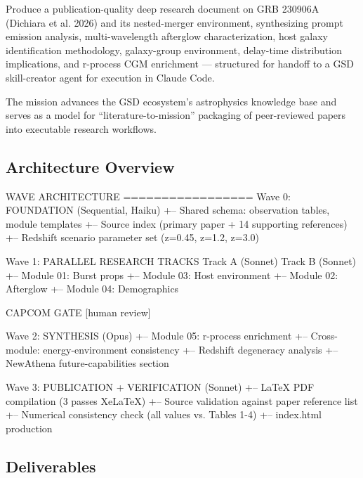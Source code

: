 \documentclass[11pt,letterpaper]{article}
\begin{document}
Produce a publication-quality deep research document on GRB 230906A (Dichiara et al. 2026) and its nested-merger environment, synthesizing prompt emission analysis, multi-wavelength afterglow characterization, host galaxy identification methodology, galaxy-group environment, delay-time distribution implications, and r-process CGM enrichment --- structured for handoff to a GSD skill-creator agent for execution in Claude Code.

The mission advances the GSD ecosystem's astrophysics knowledge base and serves as a model for ``literature-to-mission'' packaging of peer-reviewed papers into executable research workflows.

\subsection{Architecture Overview}

\begin{asciibox}
WAVE ARCHITECTURE
=================
Wave 0: FOUNDATION (Sequential, Haiku)
  +-- Shared schema: observation tables, module templates
  +-- Source index (primary paper + 14 supporting references)
  +-- Redshift scenario parameter set (z=0.45, z=1.2, z=3.0)

Wave 1: PARALLEL RESEARCH TRACKS
  Track A (Sonnet)              Track B (Sonnet)
  +-- Module 01: Burst props    +-- Module 03: Host environment
  +-- Module 02: Afterglow      +-- Module 04: Demographics

                  CAPCOM GATE [human review]

Wave 2: SYNTHESIS (Opus)
  +-- Module 05: r-process enrichment
  +-- Cross-module: energy-environment consistency
  +-- Redshift degeneracy analysis
  +-- NewAthena future-capabilities section

Wave 3: PUBLICATION + VERIFICATION (Sonnet)
  +-- LaTeX PDF compilation (3 passes XeLaTeX)
  +-- Source validation against paper reference list
  +-- Numerical consistency check (all values vs. Tables 1-4)
  +-- index.html production
\end{asciibox}

\subsection{Deliverables}
\end{document}
